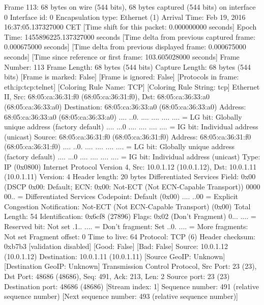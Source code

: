 Frame 113: 68 bytes on wire (544 bits), 68 bytes captured (544 bits) on interface 0
    Interface id: 0
    Encapsulation type: Ethernet (1)
    Arrival Time: Feb 19, 2016 16:37:05.137327000 CET
    [Time shift for this packet: 0.000000000 seconds]
    Epoch Time: 1455896225.137327000 seconds
    [Time delta from previous captured frame: 0.000675000 seconds]
    [Time delta from previous displayed frame: 0.000675000 seconds]
    [Time since reference or first frame: 103.605028000 seconds]
    Frame Number: 113
    Frame Length: 68 bytes (544 bits)
    Capture Length: 68 bytes (544 bits)
    [Frame is marked: False]
    [Frame is ignored: False]
    [Protocols in frame: eth:ip:tcp:telnet]
    [Coloring Rule Name: TCP]
    [Coloring Rule String: tcp]
Ethernet II, Src: 68:05:ca:36:31:f0 (68:05:ca:36:31:f0), Dst: 68:05:ca:36:33:a0 (68:05:ca:36:33:a0)
    Destination: 68:05:ca:36:33:a0 (68:05:ca:36:33:a0)
        Address: 68:05:ca:36:33:a0 (68:05:ca:36:33:a0)
        .... ..0. .... .... .... .... = LG bit: Globally unique address (factory default)
        .... ...0 .... .... .... .... = IG bit: Individual address (unicast)
    Source: 68:05:ca:36:31:f0 (68:05:ca:36:31:f0)
        Address: 68:05:ca:36:31:f0 (68:05:ca:36:31:f0)
        .... ..0. .... .... .... .... = LG bit: Globally unique address (factory default)
        .... ...0 .... .... .... .... = IG bit: Individual address (unicast)
    Type: IP (0x0800)
Internet Protocol Version 4, Src: 10.0.1.12 (10.0.1.12), Dst: 10.0.1.11 (10.0.1.11)
    Version: 4
    Header length: 20 bytes
    Differentiated Services Field: 0x00 (DSCP 0x00: Default; ECN: 0x00: Not-ECT (Not ECN-Capable Transport))
        0000 00.. = Differentiated Services Codepoint: Default (0x00)
        .... ..00 = Explicit Congestion Notification: Not-ECT (Not ECN-Capable Transport) (0x00)
    Total Length: 54
    Identification: 0x6cf8 (27896)
    Flags: 0x02 (Don't Fragment)
        0... .... = Reserved bit: Not set
        .1.. .... = Don't fragment: Set
        ..0. .... = More fragments: Not set
    Fragment offset: 0
    Time to live: 64
    Protocol: TCP (6)
    Header checksum: 0xb7b3 [validation disabled]
        [Good: False]
        [Bad: False]
    Source: 10.0.1.12 (10.0.1.12)
    Destination: 10.0.1.11 (10.0.1.11)
    [Source GeoIP: Unknown]
    [Destination GeoIP: Unknown]
Transmission Control Protocol, Src Port: 23 (23), Dst Port: 48686 (48686), Seq: 491, Ack: 213, Len: 2
    Source port: 23 (23)
    Destination port: 48686 (48686)
    [Stream index: 1]
    Sequence number: 491    (relative sequence number)
    [Next sequence number: 493    (relative sequence number)]
